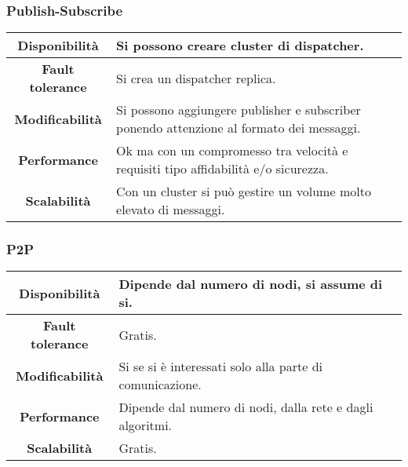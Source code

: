 \subsubsection{Publish-Subscribe}
\begin{table}[!h]
	\centering
	\begin{tabular}{|c|p{10cm}|}
		\hline
		\textbf{Disponibilità} & Si possono creare cluster di dispatcher.\\
		\hline
		\textbf{Fault tolerance}&Si crea un dispatcher replica. \\
		\hline
		\textbf{Modificabilità} & Si possono aggiungere publisher e subscriber ponendo attenzione al formato dei messaggi.\\
		\hline
		\textbf{Performance} & Ok ma con un compromesso tra velocità e requisiti tipo affidabilità e/o sicurezza.\\
		\hline
		\textbf{Scalabilità} & Con un cluster si può gestire un volume molto elevato di messaggi.\\
		\hline
	\end{tabular}
\end{table}

\subsubsection{P2P}
\begin{table}[!h]
	\centering
	\begin{tabular}{|c|p{10cm}|}
		\hline
		\textbf{Disponibilità} & Dipende dal numero di nodi, si assume di si.\\
		\hline
		\textbf{Fault tolerance}&Gratis. \\
		\hline
		\textbf{Modificabilità} & Si se si è interessati solo alla parte di comunicazione.\\
		\hline
		\textbf{Performance} & Dipende dal numero di nodi, dalla rete e dagli algoritmi.\\
		\hline
		\textbf{Scalabilità} & Gratis.\\
		\hline
	\end{tabular}
\end{table}